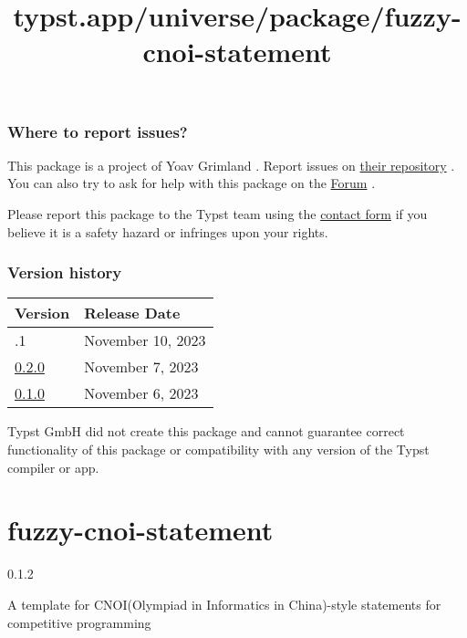 \subsubsection{Where to report issues?}\label{where-to-report-issues}

This package is a project of Yoav Grimland . Report issues on
\href{https://github.com/miestrode/sourcerer}{their repository} . You
can also try to ask for help with this package on the
\href{https://forum.typst.app}{Forum} .

Please report this package to the Typst team using the
\href{https://typst.app/contact}{contact form} if you believe it is a
safety hazard or infringes upon your rights.

\label{versions}
\subsubsection{Version history}\label{version-history}

\begin{longtable}[]{@{}ll@{}}
\toprule\noalign{}
Version & Release Date \\
\midrule\noalign{}
\endhead
\bottomrule\noalign{}
\endlastfoot
0.2.1 & November 10, 2023 \\
\href{https://typst.app/universe/package/sourcerer/0.2.0/}{0.2.0} &
November 7, 2023 \\
\href{https://typst.app/universe/package/sourcerer/0.1.0/}{0.1.0} &
November 6, 2023 \\
\end{longtable}

Typst GmbH did not create this package and cannot guarantee correct
functionality of this package or compatibility with any version of the
Typst compiler or app.


\title{typst.app/universe/package/fuzzy-cnoi-statement}

\label{banner}
\label{template-thumbnail}

\section{fuzzy-cnoi-statement}\label{fuzzy-cnoi-statement}

{ 0.1.2 }

A template for CNOI(Olympiad in Informatics in China)-style statements
for competitive programming

